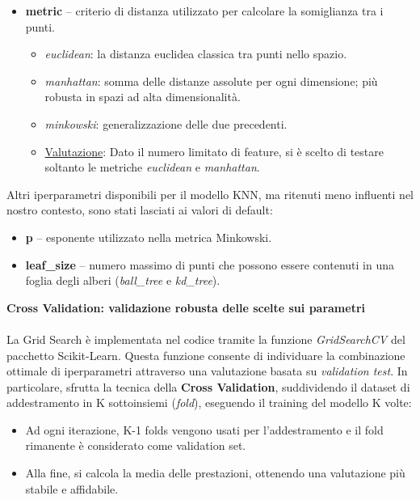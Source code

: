 \documentclass{article}
\begin{document}
\begin{itemize}
    \item \textbf{metric} -- criterio di distanza utilizzato per calcolare la somiglianza tra i punti.
    \begin{itemize}
        \item \textit{euclidean}: la distanza euclidea classica tra punti nello spazio.
        \item \textit{manhattan}: somma delle distanze assolute per ogni dimensione; più robusta in spazi ad alta dimensionalità.
        \item \textit{minkowski}: generalizzazione delle due precedenti.
        \item \underline{Valutazione}: Dato il numero limitato di feature, si è scelto di testare soltanto le metriche \textit{euclidean} e \textit{manhattan}.
    \end{itemize}
\end{itemize}

Altri iperparametri disponibili per il modello KNN, ma ritenuti meno influenti nel nostro contesto, sono stati lasciati ai valori di default:
\begin{itemize}
    \item \textbf{p} -- esponente utilizzato nella metrica Minkowski.
    \item \textbf{leaf\_size} -- numero massimo di punti che possono essere contenuti in una foglia degli alberi (\textit{ball\_tree} e \textit{kd\_tree}).
\end{itemize}

\textbf{Cross Validation: validazione robusta delle scelte sui parametri
}\\\\
La Grid Search è implementata nel codice tramite la funzione \textit{GridSearchCV} del pacchetto Scikit-Learn. Questa funzione consente di individuare la combinazione ottimale di iperparametri attraverso una valutazione basata su \textit{validation test}. 
In particolare, sfrutta la tecnica della \textbf{Cross Validation}, suddividendo il dataset di addestramento in K sottoinsiemi (\textit{fold}), eseguendo il training del modello K volte:
\begin{itemize}
    \item Ad ogni iterazione, K-1 folds vengono usati per l'addestramento e il fold rimanente è considerato come validation set.
    \item Alla fine, si calcola la media delle prestazioni, ottenendo una valutazione più stabile e affidabile.
\end{itemize}
\end{document}
